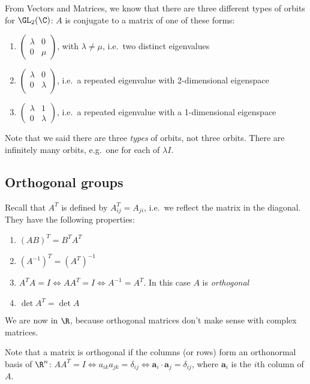 \documentclass[a4paper]{article}
\begin{document}
From Vectors and Matrices, we know that there are three different types of orbits for $\GL_2(\C)$: $A$ is conjugate to a matrix of one of these forms:
\begin{enumerate}
  \item $
    \begin{pmatrix}
      \lambda & 0\\
      0 & \mu
    \end{pmatrix}
    $, with $\lambda \not= \mu$, i.e.\ two distinct eigenvalues
  \item $
    \begin{pmatrix}
      \lambda & 0\\
      0 & \lambda\\
    \end{pmatrix}$, i.e.\ a repeated eigenvalue with 2-dimensional eigenspace
  \item $
    \begin{pmatrix}
      \lambda & 1\\
      0 & \lambda
    \end{pmatrix}$, i.e.\ a repeated eigenvalue with a 1-dimensional eigenspace
\end{enumerate}
Note that we said there are three \emph{types} of orbits, not three orbits. There are infinitely many orbits, e.g.\ one for each of $\lambda I$.
\subsection{Orthogonal groups}
Recall that $A^T$ is defined by $A^{T}_{ij} = A_{ji}$, i.e.\ we reflect the matrix in the diagonal. They have the following properties:
\begin{enumerate}
  \item $(AB)^T = B^TA^T$
  \item $(A^{-1})^T = (A^T)^{-1}$
  \item $A^{T}A = I\Leftrightarrow AA^{T} = I\Leftrightarrow A^{-1} = A^{T}$. In this case $A$ is \emph{orthogonal}
  \item $\det A^{T} = \det A$
\end{enumerate}
We are now in $\R$, because orthogonal matrices don't make sense with complex matrices.

Note that a matrix is orthogonal if the columns (or rows) form an orthonormal basis of $\R^n$: $AA^T = I\Leftrightarrow a_{ik}a_{jk} = \delta_{ij} \Leftrightarrow \mathbf{a}_i\cdot \mathbf{a}_j = \delta_{ij}$, where $\mathbf{a}_i$ is the $i$th column of $A$.
\end{document}
